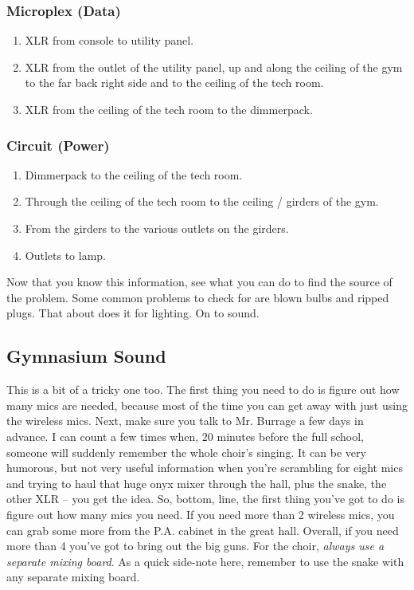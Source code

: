 \documentclass[letterpaper,10pt,oneside,headsepline]{scrreprt}
\begin{document}
\subsubsection{Microplex (Data)}
\begin{enumerate}
\item XLR from console to utility panel.
\item XLR from the outlet of the utility panel, up and along the ceiling of the gym to the far back right side and to the ceiling of the tech room.
\item XLR from the ceiling of the tech room to the dimmerpack.
\end{enumerate}

\subsubsection{Circuit (Power)}
\begin{enumerate}
\item Dimmerpack to the ceiling of the tech room.
\item Through the ceiling of the tech room to the ceiling / girders of the gym.
\item From the girders to the various outlets on the girders.
\item Outlets to lamp.
\end{enumerate}

Now that you know this information, see what you can do to find the source of the problem. Some common problems to check for are blown bulbs and ripped plugs. That about does it for lighting. On to sound.

\subsection{Gymnasium Sound}
This is a bit of a tricky one too. The first thing you need to do is figure out how many mics are needed, because most of the time you can get away with just using the wireless mics. Next, make sure you talk to Mr. Burrage a few days in advance. I can count a few times when, 20 minutes before the full school, someone will suddenly remember the whole choir's singing. It can be very humorous, but not very useful information when you're scrambling for eight mics and trying to haul that huge onyx mixer through the hall, plus the snake, the other XLR -- you get the idea. So, bottom, line, the first thing you've got to do is figure out how many mics you need. If you need more than 2 wireless mics, you can grab some more from the P.A. cabinet in the great hall. Overall, if you need more than 4 you've got to bring out the big guns. For the choir, \textit{always use a separate mixing board}. As a quick side-note here, remember to use the snake with any separate mixing board.
\end{document}

